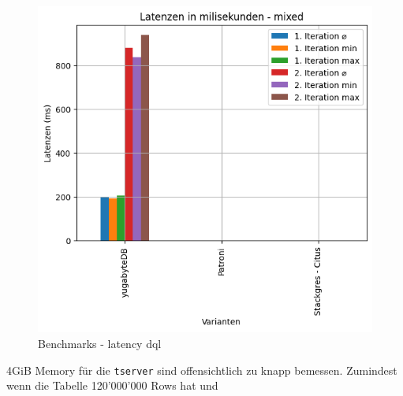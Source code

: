 \begin{flushleft}
    \begin{figure}[H]
        \centering
        \includegraphics[width=1\linewidth]{source/pandas_data_chart_plotter/latency_dql}
        \caption{Benchmarks - latency dql}
        \label{fig:latency_dql}
    \end{figure}
\end{flushleft}
\begin{flushleft}
    \begin{warning}
        4GiB Memory für die \texttt{tserver} sind offensichtlich zu knapp bemessen.
        Zumindest wenn die Tabelle 120'000'000 Rows hat und
    \end{warning}
\end{flushleft}
